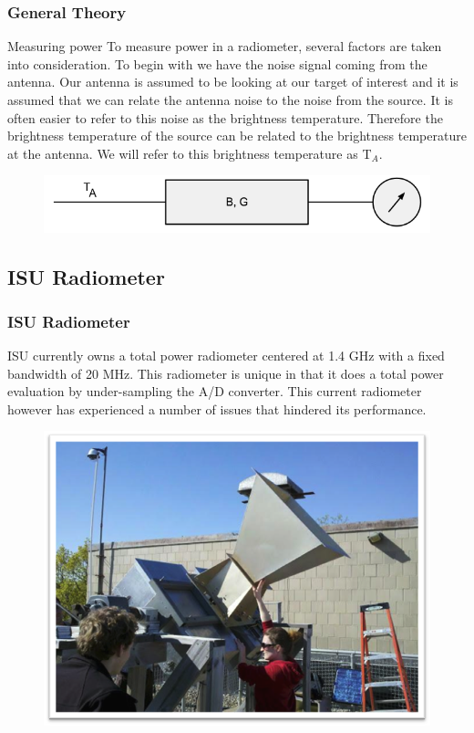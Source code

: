 \documentclass{beamer}
\begin{document}
\begin{frame}
\frametitle{General Theory}
\begin{block}{Measuring power}
To measure power in a radiometer, several factors are taken into consideration.  To begin with we have the noise signal coming from the antenna.  Our antenna is assumed to be looking at our target of interest and it is assumed that we can relate the antenna noise to the noise from the source.  It is often easier to refer to this noise as the brightness temperature.  Therefore the brightness temperature of the source can be related to the brightness temperature at the antenna.  We will refer to this brightness temperature as T$_{A}$.  

{\begin{figure}[h!tb] 
\centering
\includegraphics[width=\textwidth]{../Images/simple_rad.png}
\label{simplerad}
\end{figure}
}
\end{block}
\end{frame}

\subsection{ISU Radiometer}
\begin{frame}
\frametitle{ISU Radiometer}
\begin{block}{}
ISU currently owns a total power radiometer centered at 1.4 GHz with a fixed bandwidth of 20 MHz.  This radiometer is unique in that it does a total power evaluation by under-sampling the A/D converter.  This current radiometer however has experienced a number of issues that hindered its performance.  
\end{block}

\begin{figure}
\includegraphics[width=0.45\linewidth]{images/agronomy_roof.png}
\end{figure}
\end{frame}
\end{document}
